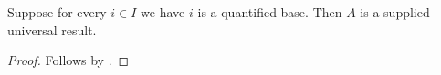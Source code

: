 

\begin{classification}\label{supplied_unanchored_rule}
    Suppose for every $i\in I$ we have $i$ is a quantified base.
    Then $A$ is a supplied-universal result.
\end{classification}
\begin{proof}
    Follows by .
\end{proof}
